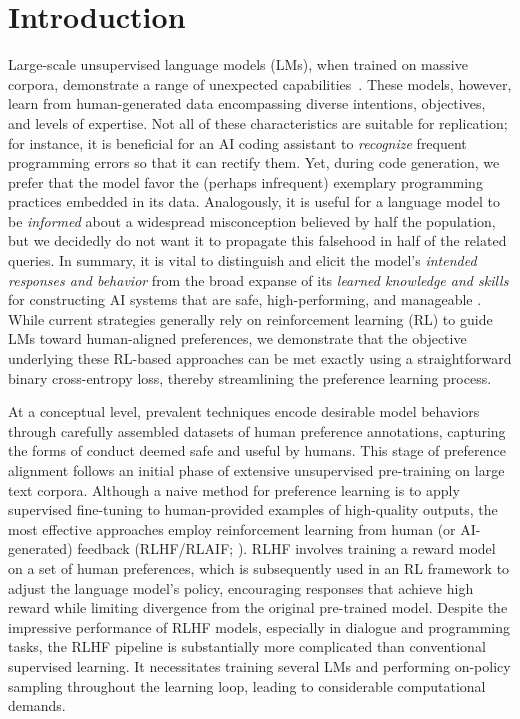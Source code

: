 \section{Introduction}
Large-scale unsupervised language models (LMs), when trained on massive corpora, demonstrate a range of unexpected capabilities~\citep{chowdhery2022palm, brown2020language, touvron2023llama,bubeck2023sparks}. These models, however, learn from human-generated data encompassing diverse intentions, objectives, and levels of expertise. Not all of these characteristics are suitable for replication; for instance, it is beneficial for an AI coding assistant to \textit{recognize} frequent programming errors so that it can rectify them. Yet, during code generation, we prefer that the model favor the (perhaps infrequent) exemplary programming practices embedded in its data. Analogously, it is useful for a language model to be \textit{informed} about a widespread misconception believed by half the population, but we decidedly do not want it to propagate this falsehood in half of the related queries. In summary, it is vital to distinguish and elicit the model’s \emph{intended responses and behavior} from the broad expanse of its \textit{learned knowledge and skills} for constructing AI systems that are safe, high-performing, and manageable \citep{ouyang2022training}. While current strategies generally rely on reinforcement learning (RL) to guide LMs toward human-aligned preferences, we demonstrate that the objective underlying these RL-based approaches can be met exactly using a straightforward binary cross-entropy loss, thereby streamlining the preference learning process.

At a conceptual level, prevalent techniques encode desirable model behaviors through carefully assembled datasets of human preference annotations, capturing the forms of conduct deemed safe and useful by humans. This stage of preference alignment follows an initial phase of extensive unsupervised pre-training on large text corpora. Although a naive method for preference learning is to apply supervised fine-tuning to human-provided examples of high-quality outputs, the most effective approaches employ reinforcement learning from human (or AI-generated) feedback (RLHF/RLAIF; \citep{christiano2017deep,bai2022constitutional}). RLHF involves training a reward model on a set of human preferences, which is subsequently used in an RL framework to adjust the language model’s policy, encouraging responses that achieve high reward while limiting divergence from the original pre-trained model. Despite the impressive performance of RLHF models, especially in dialogue and programming tasks, the RLHF pipeline is substantially more complicated than conventional supervised learning. It necessitates training several LMs and performing on-policy sampling throughout the learning loop, leading to considerable computational demands.

